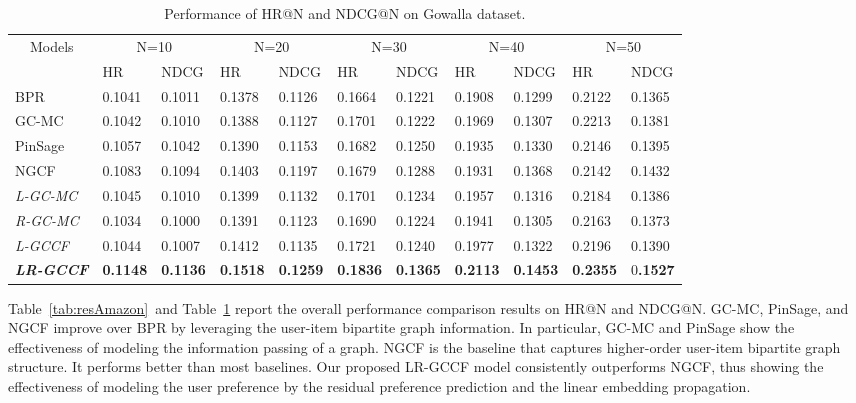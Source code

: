 \documentclass[letterpaper]{article} %
\begin{document}
\begin{small}
\begin{table}[h]
\footnotesize
\centering
\caption{Performance of HR@N and NDCG@N on Gowalla dataset.}\label{tab:resGowalla}
\begin{tabular}{|l|l|l|l|l|l|l|l|l|l|l|}
\hline
\multicolumn{1}{|c|}{\multirow{2}{*}{Models}} & \multicolumn{2}{c|}{N=10} & \multicolumn{2}{c|}{N=20} & \multicolumn{2}{c|}{N=30} & \multicolumn{2}{c|}{N=40} & \multicolumn{2}{c|}{N=50} \\ \cline{2-11}
\multicolumn{1}{|c|}{} & HR & NDCG & HR & NDCG & HR & NDCG & HR & NDCG & HR & NDCG \\ \hline
BPR & 0.1041 & 0.1011 & 0.1378 & 0.1126 & 0.1664 & 0.1221 & 0.1908 & 0.1299 & 0.2122 & 0.1365 \\ \hline
GC-MC & 0.1042 & 0.1010 & 0.1388 & 0.1127 & 0.1701 & 0.1222 & 0.1969 & 0.1307 & 0.2213 & 0.1381 \\ \hline
PinSage & 0.1057 & 0.1042 & 0.1390 & 0.1153 & 0.1682 & 0.1250 & 0.1935 & 0.1330 & 0.2146 & 0.1395 \\ \hline
NGCF & 0.1083 & 0.1094 & 0.1403 & 0.1197 & 0.1679 & 0.1288 & 0.1931 & 0.1368 & 0.2142 & 0.1432 \\ \hline
\emph{L-GC-MC} & 0.1045 & 0.1010 & 0.1399 & 0.1132 & 0.1701 & 0.1234 & 0.1957 & 0.1316 & 0.2184 & 0.1386 \\ \hline
\emph{R-GC-MC} & 0.1034 & 0.1000 & 0.1391 & 0.1123 & 0.1690 & 0.1224 & 0.1941 & 0.1305 & 0.2163 & 0.1373 \\ \hline
\emph{L-GCCF} & 0.1044 & 0.1007 & 0.1412 & 0.1135 & 0.1721 & 0.1240 & 0.1977 & 0.1322 & 0.2196 & 0.1390 \\ \hline
\emph{\textbf{LR-GCCF}} & \textbf{0.1148} & \textbf{0.1136} & \textbf{0.1518} & \textbf{0.1259} & \textbf{0.1836} & \textbf{0.1365} & \textbf{0.2113} & \textbf{0.1453} & \textbf{0.2355} & 0\textbf{.1527} \\ \hline
\end{tabular}
\end{table}
\end{small}



Table~\ref{tab:resAmazon}~and Table~\ref{tab:resGowalla} report the overall performance comparison results on HR@N and NDCG@N. GC-MC, PinSage, and NGCF improve over BPR by leveraging the user-item bipartite graph information. In particular, GC-MC and PinSage show the effectiveness of modeling the information passing of a graph.  NGCF is the baseline that captures higher-order user-item bipartite graph structure. It performs better than most baselines. Our proposed LR-GCCF model consistently outperforms NGCF, thus showing the effectiveness of modeling the user preference by the residual preference prediction and the linear embedding propagation.
\end{document}
